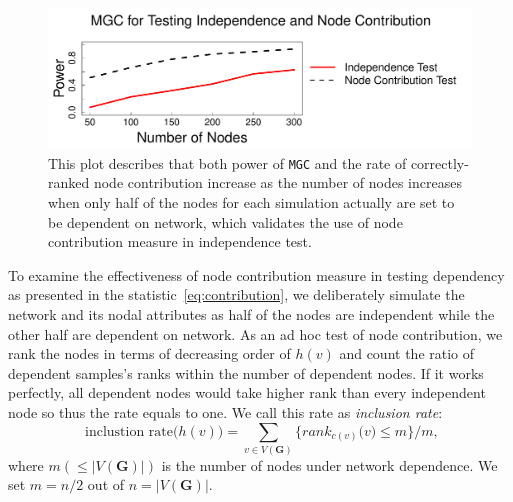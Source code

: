 \documentclass[11pt]{article}
\theoremstyle{definition}
\begin{document}
\begin{figure}[h]
	\centering
	\includegraphics[width=\linewidth]{nodecontri.pdf}
	\caption{This plot describes that both power of \texttt{MGC} and the rate of correctly-ranked node contribution increase as the number of nodes increases when only half of the nodes for each simulation actually are set to be dependent on network, which validates the use of node contribution measure in independence test.}
	\label{fig:contribution}
\end{figure}
To examine the effectiveness of node contribution measure in testing dependency as presented in the statistic~\ref{eq:contribution}, we deliberately simulate the network and its nodal attributes as half of the nodes are independent while the other half are dependent on network. As an ad hoc test of node contribution, we rank the nodes in terms of decreasing order of $h(v)$ and count the ratio of dependent samples's ranks within the number of dependent nodes. If it works perfectly, all dependent nodes would take higher rank than every independent node so thus the rate equals to one. We call this rate as \textit{inclusion rate}:
\begin{equation}
\mbox{ inclustion rate}\big(  h(v) \big) = \sum\limits_{v \in V(\mathbf{G})} \big\{  rank_{c(v)}\big(  v \big)  \leq  m  \big\}   /  m,
\label{eq:inclusion_rate}
\end{equation}
where $m (\leq |V(\mathbf{G})|)$ is the number of nodes under network dependence. We set $m=n/2$ out of $n = |V(\mathbf{G})|$.


\end{document}
